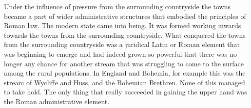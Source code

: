 Under the influence of pressure from the surrounding countryside the towns became a part of wider administrative structures that embodied the principles of Roman law. The modern state came into being. It was formed working inwards towards the towns from the surrounding countryside. What conquered the towns from the surrounding countryside was a juridical Latin or Roman element that was beginning to emerge and had indeed grown so powerful that there was no longer any chance for another stream that was struggling to come to the surface among the rural populations. In England and Bohemia, for example this was the stream of Wycliffe and Huss, and the Bohemian Brethren. None of this managed to take hold. The only thing that really succeeded in gaining the upper hand was the Roman administrative element.



